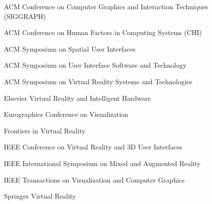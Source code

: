     \begin{cvitems} %
      \item {ACM Conference on Computer Graphics and Interaction Techniques (SIGGRAPH)}
      \item {ACM Conference on Human Factors in Computing Systems (CHI)}
      \item {ACM Symposium on Spatial User Interfaces}
      \item {ACM Symposium on User Interface Software and Technology}
      \item {ACM Symposium on Virtual Reality Systems and Technologies}
      \item {Elsevier Virtual Reality and Intelligent Hardware}
      \item {Eurographics Conference on Visualization}
      \item {Frontiers in Virtual Reality}
      \item {IEEE Conference on Virtual Reality and 3D User Interfaces}
      \item {IEEE International Symposium on Mixed and Augmented Reality}
      \item {IEEE Transactions on Visualization and Computer Graphics}
      \item {Springer Virtual Reality}
    \end{cvitems}
  

